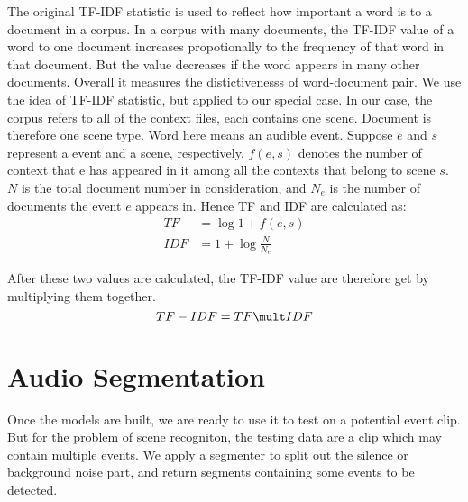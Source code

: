 The original TF-IDF statistic is used to reflect how important a word is to a document in a corpus. 
In a corpus with many documents, the TF-IDF value of a word to one document increases propotionally to the frequency of that word in that document. 
But the value decreases if the word appears in many other documents. 
Overall it measures the distictivenesss of word-document pair. 
We use the idea of TF-IDF statistic, but applied to our special case. 
In our case, the corpus refers to all of the context files, each contains one scene. 
Document is therefore one scene type. 
Word here means an audible event. 
Suppose $e$ and $s$ represent a event and a scene, respectively. 
$f(e,s)$ denotes the number of context that e has appeared in it among all the contexts that belong to scene $s$.  
$N$ is the total document number in consideration, and $N_e$ is the number of documents the event $e$ appears in. 
Hence TF and IDF are calculated as: 
\begin{equation}
\begin{split}
 TF &= \log{1+f(e,s)} \\ 
 IDF &= 1 + \log{\frac{N}{N_e}}
\end{split}
\end{equation} 

After these two values are calculated, the TF-IDF value are therefore get by multiplying them together. 
\begin{equation}
 TF-IDF = TF \mult IDF 
\end{equation}

\section{Audio Segmentation}
Once the models are built, we are ready to use it to test on a potential event clip. 
But for the problem of scene recogniton, the testing data are a clip which may contain multiple events. 
We apply a segmenter to split out the silence or background noise part, and return segments containing some events to be detected. 

